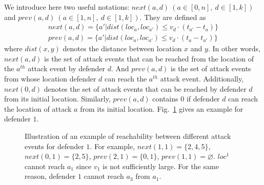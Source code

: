 We introduce here two useful notations: $next(a, d)\ (a\in[0, n],\ d\in[1,k])$ and $prev(a, d)\ (a\in[1,n],\ d \in [1,k])$.
They are defined as
\begin{align}
next(a, d) = \{ a'| dist(loc_a, loc_{a'}) \leq v_d \cdot (t_{a'} - t_a) \}    \\
prev(a, d) = \{ a'| dist(loc_a, loc_{a'}) \leq v_d \cdot (t_a - t_{a'}) \}    
\end{align}
where $dist(x,y)$ denotes the distance between location $x$ and $y$. 
In other words, $next(a, d)$ is the set of 
attack events that can be reached from the location of the $a^{th}$ attack event by defender $d$. 
And $prev(a,d)$ is the set of attack events from whose location defender $d$ can reach the $a^{th}$ attack event. 
Additionally, $next(0, d)$ denotes the set of attack events that can be reached by defender $d$ from its initial location.
Similarly, $prev(a, d)$ contains $0$ if defender $d$ can reach the location of attack $a$ from its initial location.
Fig.~\ref{fig:next_prev} gives an example for defender $1$.

\begin{figure}[h]
    \centering
{}
    \caption{Illustration of an example of reachability between different attack events for defender $1$.  
    For example, $next(1, 1) = \{2,4,5\}$, $next(0,1)=\{2,5\}$, $prev(2, 1) =\{0, 1\}$, $prev(1,1)=\varnothing$.
    $loc^1$ cannot reach $a_1$ since $v_1$ is not sufficiently large. For the same reason, defender $1$ cannot reach $a_3$ from $a_1$.
    }
    \label{fig:next_prev}
\end{figure}

